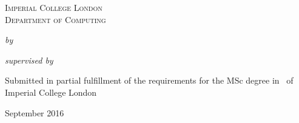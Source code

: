 \begin{titlepage}

\center

\textsc{\Large{Imperial College London}}\\[0.5cm] 
\textsc{\large{Department of Computing}}\\[0.5cm] 

\vspace{4cm}
\huge{\textbf{\reporttitle}}
\vspace{2cm}

\large{
  \emph{by} \\
  \vspace{0.1cm}
  \textbf{\name}
}

\vspace{1cm}

\large{
  \emph{supervised by} \\
  \vspace{0.1cm}
  \textbf{\supervisor}
}

\vfill %
\large{
Submitted in partial fulfillment of the requirements for the MSc degree in
\course~of Imperial College London\\[0.5cm]
}

\small{September 2016}

\end{titlepage}
